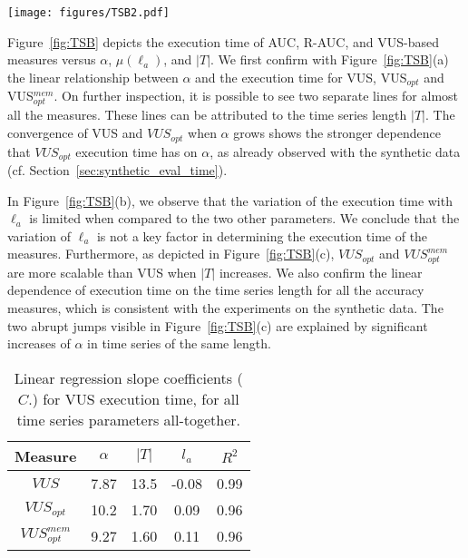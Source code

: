 \begin{figure*}[tb]
  \centering
  \texttt{[image: figures/TSB2.pdf]}
  \caption{Execution time of VUS, R-AUC, AUC-based measures on the TSB-UAD benchmark, versus $\alpha$, $\ell_a$, and $|T|$.}
  \label{fig:TSB}
\end{figure*}

Figure~\ref{fig:TSB} depicts the execution time of AUC, R-AUC, and VUS-based measures versus $\alpha$, $\mu(\ell_a)$, and $|T|$.
We first confirm with Figure~\ref{fig:TSB}(a) the linear relationship between $\alpha$ and the execution time for VUS, VUS$_{opt}$ and VUS$_{opt}^{mem}$.
On further inspection, it is possible to see two separate lines for almost all the measures. 
These lines can be attributed to the time series length $|T|$. 
The convergence of VUS and $VUS_{opt}$ when $\alpha$ grows shows the stronger dependence that $VUS_{opt}$ execution time has on $\alpha$, as already observed with the synthetic data (cf. Section~\ref{sec:synthetic_eval_time}). 

In Figure~\ref{fig:TSB}(b), we observe that the variation of the execution time with $\ell_a$ is limited when compared to the two other parameters. We conclude that the variation of $\ell_a$ is not a key factor in determining the execution time of the measures.
Furthermore, as depicted in Figure~\ref{fig:TSB}(c), $VUS_{opt}$ and $VUS_{opt}^{mem}$ are more scalable than VUS when $|T|$ increases. 
We also confirm the linear dependence of execution time on the time series length for all the accuracy measures, which is consistent with the experiments on the synthetic data. 
The two abrupt jumps visible in Figure~\ref{fig:TSB}(c) are explained by significant increases of $\alpha$ in time series of the same length. 

\begin{table}[tb]
\centering
\caption{Linear regression slope coefficients ($C.$) for VUS execution time, for all time series parameters all-together.}
\begin{tabular}{|c|ccc|c|} 
 \hline
Measure & $\alpha$ & $|T|$ & $l_a$ & $R^2$ \\ [0.5ex] 
 \hline\hline
 \multirow{1}{*}{${VUS}$} & 7.87 & 13.5 & -0.08 & 0.99  \\ 
 \hline
 \multirow{1}{*}{$VUS_{opt}$} & 10.2 & 1.70 & 0.09 & 0.96 \\
\hline
 \multirow{1}{*}{$VUS_{opt}^{mem}$} & 9.27 & 1.60 & 0.11 & 0.96 \\
 \hline
\end{tabular}
\label{tab:parameter_linear_coeff_TSB}
\end{table}



